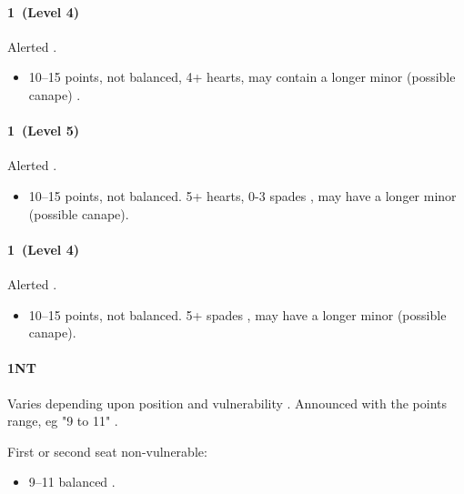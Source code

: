 {\color{CadetBlue}

\paragraph{1\hearts~(Level 4)}

Alerted .

\begin{itemize}
\item 10--15 points, not balanced, 4+ hearts, may contain a longer minor (possible canape) .
\end{itemize}
}

{\it

\paragraph{1\spades~(Level 5)}

Alerted .

\begin{itemize}
\item 10--15 points, not balanced. 5+ hearts, 0-3 spades , may have a longer minor (possible canape).
\end{itemize}

}

{\color{CadetBlue}

\paragraph{1\spades~(Level 4)}

Alerted .

\begin{itemize}
\item 10--15 points, not balanced. 5+ spades , may have a longer minor (possible canape).
\end{itemize}
}

\paragraph{1NT}

Varies depending upon position and vulnerability . Announced with the points range, eg "9 to 11" .

First or second seat non-vulnerable:
\begin{itemize}
	\item 9--11 balanced .
\end{itemize}

